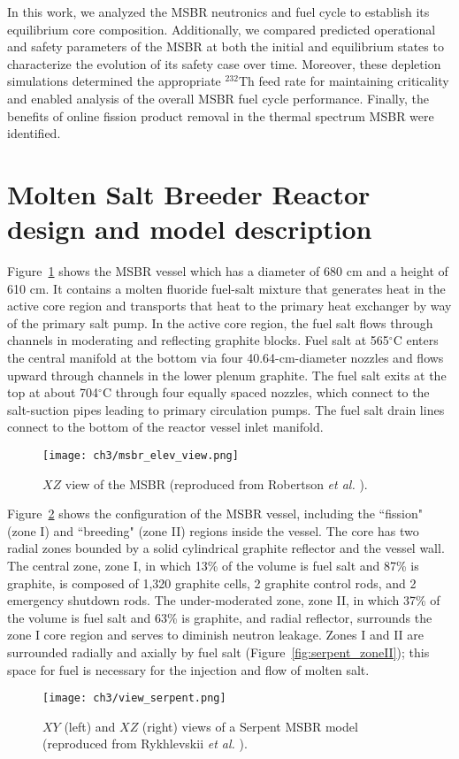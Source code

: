 In this work, we analyzed the \gls{MSBR} neutronics and fuel cycle to  
establish its equilibrium core composition. Additionally, we compared  
predicted operational and safety parameters of the \gls{MSBR} at both the  
initial and equilibrium states to characterize the evolution of its safety 
case over time. Moreover, these depletion simulations determined the  
appropriate $^{232}$Th feed rate for maintaining criticality and enabled 
analysis of the overall \gls{MSBR} fuel cycle performance. Finally, the 
benefits of online fission product removal in the thermal spectrum \gls{MSBR} 
were identified.


\section{Molten Salt Breeder Reactor design and model description}
Figure~\ref{fig:msbr_elev_view} shows the \gls{MSBR} vessel which has a 
diameter of 680 cm and
a height of 610 cm. It contains a molten fluoride 
fuel-salt mixture that generates heat in the active core region and transports 
that heat to the primary heat exchanger by way of the primary salt pump. In 
the active core region, the fuel salt flows through channels in moderating and 
reflecting graphite blocks. Fuel salt at 565$^{\circ}$C enters the central 
manifold at the bottom via four 40.64-cm-diameter nozzles and flows upward 
through channels in the lower plenum graphite. The fuel salt exits at the top 
at about 704$^{\circ}$C through four equally spaced nozzles, which connect to 
the salt-suction pipes leading to primary circulation pumps. The fuel salt 
drain lines connect to the bottom of the reactor vessel inlet manifold.
\begin{figure}[ht!] %
	\texttt{[image: ch3/msbr\_elev\_view.png]}
	\caption{$XZ$ view of the \gls{MSBR} (reproduced from Robertson \emph{et 
	al.} \cite{robertson_conceptual_1971}).}
	\label{fig:msbr_elev_view}
\end{figure}

Figure~\ref{fig:serpent_plan_view} shows the configuration of the \gls{MSBR} 
vessel, including the ``fission" (zone I) and ``breeding" (zone II) regions 
inside the vessel. The core has two radial zones bounded by a solid  
cylindrical graphite reflector and the vessel wall. The central zone, zone I, 
in which 13\% of the volume is fuel salt and 87\% is graphite, is composed of 
1,320 graphite cells, 2 graphite control rods, and 2 emergency shutdown rods. 
The under-moderated zone, zone II, in which 37\% of the volume is fuel salt 
and 63\% is graphite, and radial reflector, surrounds the zone I core region 
and serves to diminish neutron leakage. Zones I and II are surrounded radially 
and axially by fuel salt (Figure~\ref{fig:serpent_zoneII}); this space for 
fuel is necessary for the injection and flow of molten salt.
\begin{figure}[htb!] %
	\texttt{[image: ch3/view\_serpent.png]}
	\caption{$XY$ (left) and $XZ$ (right) views of a Serpent \gls{MSBR} model
	(reproduced from Rykhlevskii \emph{et al.} 
	\cite{rykhlevskii_modeling_2019}).}
	\label{fig:serpent_plan_view}
\end{figure}

